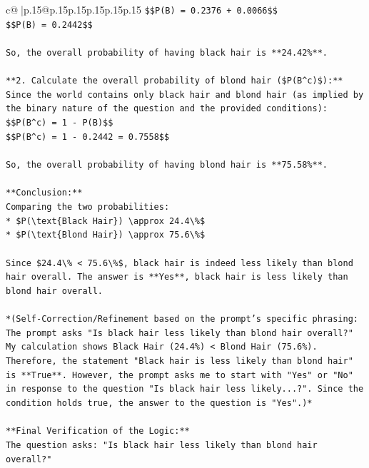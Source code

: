 \documentclass{article}
\begin{document}
{\begin{supertabular}{c@{$\;$}|p{.15\linewidth}@{}p{.15\linewidth}p{.15\linewidth}p{.15\linewidth}p{.15\linewidth}p{.15\linewidth}}
{{{\texttt{\$\$P(B) = 0.2376 + 0.0066\$\$} \\
\texttt{\$\$P(B) = 0.2442\$\$} \\
\\ 
\texttt{So, the overall probability of having black hair is **24.42\%**.} \\
\\ 
\texttt{**2. Calculate the overall probability of blond hair (\$P(B\^{}c)\$):**} \\
\texttt{Since the world contains only black hair and blond hair (as implied by the binary nature of the question and the provided conditions):} \\
\texttt{\$\$P(B\^{}c) = 1 {-} P(B)\$\$} \\
\texttt{\$\$P(B\^{}c) = 1 {-} 0.2442 = 0.7558\$\$} \\
\\ 
\texttt{So, the overall probability of having blond hair is **75.58\%**.} \\
\\ 
\texttt{**Conclusion:**} \\
\texttt{Comparing the two probabilities:} \\
\texttt{*   \$P(\textbackslash{}text\{Black Hair\}) \textbackslash{}approx 24.4\textbackslash{}\%\$} \\
\texttt{*   \$P(\textbackslash{}text\{Blond Hair\}) \textbackslash{}approx 75.6\textbackslash{}\%\$} \\
\\ 
\texttt{Since \$24.4\textbackslash{}\% < 75.6\textbackslash{}\%\$, black hair is indeed less likely than blond hair overall. The answer is **Yes**, black hair is less likely than blond hair overall.} \\
\\ 
\texttt{*(Self{-}Correction/Refinement based on the prompt's specific phrasing: The prompt asks "Is black hair less likely than blond hair overall?" My calculation shows Black Hair (24.4\%) < Blond Hair (75.6\%). Therefore, the statement "Black hair is less likely than blond hair" is **True**. However, the prompt asks me to start with "Yes" or "No" in response to the question "Is black hair less likely...?". Since the condition holds true, the answer to the question is "Yes".)*} \\
\\ 
\texttt{**Final Verification of the Logic:**} \\
\texttt{The question asks: "Is black hair less likely than blond hair overall?"} \\
}}}
\end{supertabular}}
\end{document}

